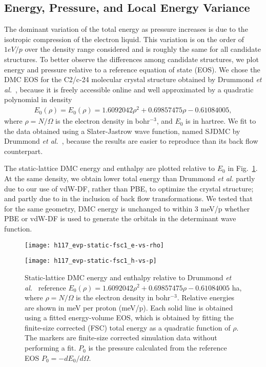 \subsection{Energy, Pressure, and Local Energy Variance}

The dominant variation of the total energy as pressure increases is due to the isotropic compression of the electron liquid. This variation is on the order of $1 eV/p$ over the density range considered and is roughly the same for all candidate structures.
To better observe the differences among candidate structures, we plot energy and pressure relative to a reference equation of state (EOS).
We chose the DMC EOS for the C2/c-24 molecular crystal structure obtained by Drummond \textit{et al.}~\cite{Drummond2015}, because it is freely accessible online and well approximated by a quadratic polynomial in density
\begin{align}
E_0(\rho) = E_0(\rho) = 1.6092042\rho^2 + 0.69857475\rho - 0.61084005,
\end{align}
where $\rho=N/\Omega$ is the electron density in bohr$^{-3}$, and $E_0$ is in hartree.
We fit to the data obtained using a Slater-Jastrow wave function, named SJDMC by Drummond \textit{et al.}~\cite{Drummond2015}, because the results are easier to reproduce than its back flow counterpart.

The static-lattice DMC energy and enthalpy are plotted relative to $E_0$ in Fig.~\ref{fig:static-qmc-vs-drummond}. At the same density, we obtain lower total energy than Drummond \textit{et al.} partly due to our use of vdW-DF, rather than  PBE, to optimize the crystal structure; and partly due to in the inclusion of back flow transformations. We tested that for the same geometry, DMC energy is unchanged to within 3 meV/p whether PBE or vdW-DF is used to generate the orbitals in the determinant wave function.

\begin{figure}[h]
\begin{minipage}{0.49\textwidth}
\texttt{[image: h117\_evp-static-fsc1\_e-vs-rho]}
\end{minipage}
\begin{minipage}{0.49\textwidth}
\texttt{[image: h117\_evp-static-fsc1\_h-vs-p]}
\end{minipage}
\caption{Static-lattice DMC energy and enthalpy relative to Drummond \textit{et al.}~\cite{Drummond2015} reference $E_0(\rho) = 1.6092042\rho^2 + 0.69857475\rho - 0.61084005$ ha, where $\rho=N/\Omega$ is the electron density in bohr$^{-3}$. Relative energies are shown in meV per proton (meV/p). Each solid line is obtained using a fitted energy-volume EOS, which is obtained by fitting the finite-size corrected (FSC) total energy as a quadratic function of $\rho$. The markers are finite-size corrected simulation data without performing a fit. $P_0$ is the pressure calculated from the reference EOS $P_0=-dE_0/d\Omega$. \label{fig:static-qmc-vs-drummond}}
\end{figure}

